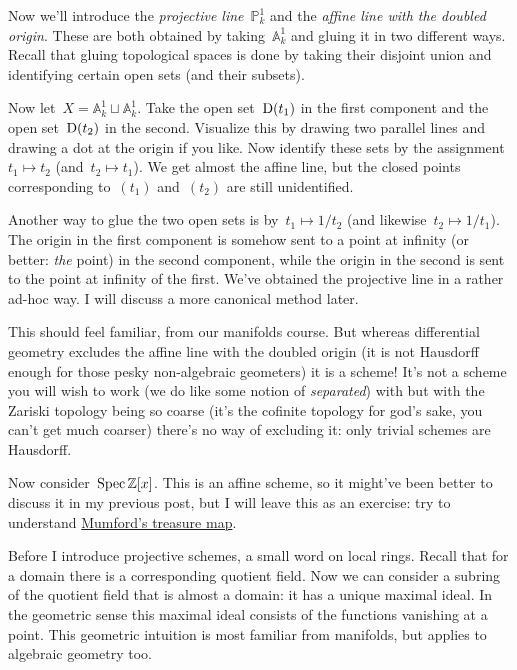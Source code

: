 \begin{example}
  Now we'll introduce the \emph{projective line}~$\mathbb{P}^1_k$ and the \emph{affine line with the doubled origin}. These are both obtained by taking~$\mathbb{A}^1_k$ and gluing it in two different ways. Recall that gluing topological spaces is done by taking their disjoint union and identifying certain open sets (and their subsets).

  Now let~$X=\mathbb{A}^1_k\sqcup\mathbb{A}^1_k$. Take the open set~$\operatorname{D}(t_1)$ in the first component and the open set~$\operatorname{D}(t_2)$ in the second. Visualize this by drawing two parallel lines and drawing a dot at the origin if you like. Now identify these sets by the assignment~$t_1\mapsto t_2$ (and~$t_2\mapsto t_1$). We get almost the affine line, but the closed points corresponding to~$(t_1)$ and~$(t_2)$ are still unidentified.

  Another way to glue the two open sets is by~$t_1\mapsto 1/t_2$ (and likewise~$t_2\mapsto 1/t_1$). The origin in the first component is somehow sent to a point at infinity (or better: \emph{the} point) in the second component, while the origin in the second is sent to the point at infinity of the first. We've obtained the projective line in a rather ad-hoc way. I will discuss a more canonical method later.

  This should feel familiar, from our manifolds course. But whereas differential geometry excludes the affine line with the doubled origin (it is not Hausdorff enough for those pesky non-algebraic geometers) it is a scheme! It's not a scheme you will wish to work (we do like some notion of \emph{separated}) with but with the Zariski topology being so coarse (it's the cofinite topology for god's sake, you can't get much coarser) there's no way of excluding it: only trivial schemes are Hausdorff.
\end{example}

\begin{example}
  Now consider~$\operatorname{Spec}\mathbb{Z}[x]$. This is an affine scheme, so it might've been better to discuss it in my previous post, but I will leave this as an exercise: try to understand \href{http://www.neverendingbooks.org/index.php/mumfords-treasure-map.html}{Mumford's treasure map}.
\end{example}

Before I introduce projective schemes, a small word on local rings. Recall that for a domain there is a corresponding quotient field. Now we can consider a subring of the quotient field that is almost a domain: it has a unique maximal ideal. In the geometric sense this maximal ideal consists of the functions vanishing at a point. This geometric intuition is most familiar from manifolds, but applies to algebraic geometry too.

